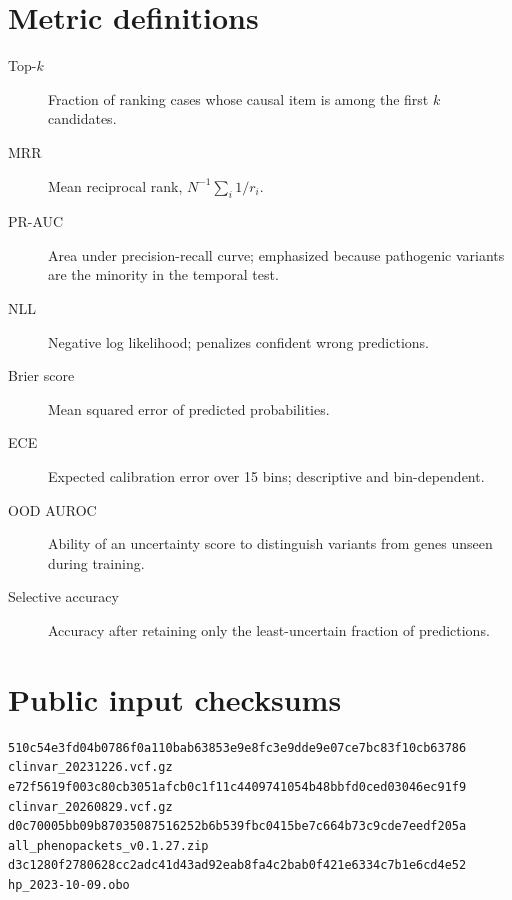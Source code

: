 \documentclass[11pt]{article}
\begin{document}
\section{Metric definitions}

\begin{description}
\item[Top-$k$] Fraction of ranking cases whose causal item is among the first $k$ candidates.
\item[MRR] Mean reciprocal rank, $N^{-1}\sum_i 1/r_i$.
\item[PR-AUC] Area under precision-recall curve; emphasized because pathogenic variants are the minority in the temporal test.
\item[NLL] Negative log likelihood; penalizes confident wrong predictions.
\item[Brier score] Mean squared error of predicted probabilities.
\item[ECE] Expected calibration error over 15 bins; descriptive and bin-dependent.
\item[OOD AUROC] Ability of an uncertainty score to distinguish variants from genes unseen during training.
\item[Selective accuracy] Accuracy after retaining only the least-uncertain fraction of predictions.
\end{description}

\section{Public input checksums}
\begin{lstlisting}
510c54e3fd04b0786f0a110bab63853e9e8fc3e9dde9e07ce7bc83f10cb63786  clinvar_20231226.vcf.gz
e72f5619f003c80cb3051afcb0c1f11c4409741054b48bbfd0ced03046ec91f9  clinvar_20260829.vcf.gz
d0c70005bb09b87035087516252b6b539fbc0415be7c664b73c9cde7eedf205a  all_phenopackets_v0.1.27.zip
d3c1280f2780628cc2adc41d43ad92eab8fa4c2bab0f421e6334c7b1e6cd4e52  hp_2023-10-09.obo
\end{lstlisting}


\end{document}
